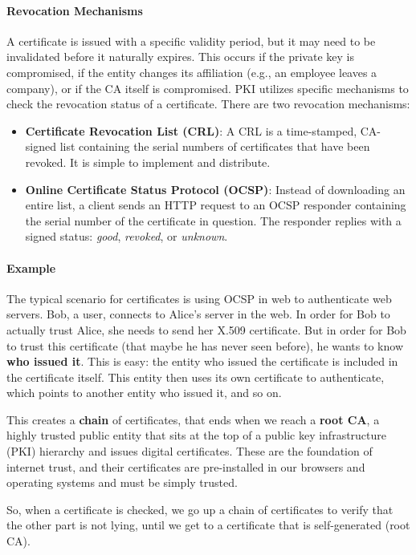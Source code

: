 \paragraph{Revocation Mechanisms}
A certificate is issued with a specific validity period, but it may need to be invalidated before it naturally expires. This occurs if the private key is compromised, if the entity changes its affiliation (e.g., an employee leaves a company), or if the CA itself is compromised. PKI utilizes specific mechanisms to check the revocation status of a certificate. There are two revocation mechanisms:
\begin{itemize}
    \item \textbf{Certificate Revocation List (CRL)}: A CRL is a time-stamped, CA-signed list containing the serial numbers of certificates that have been revoked. It is simple to implement and distribute.
    \item \textbf{Online Certificate Status Protocol (OCSP)}: Instead of downloading an entire list, a client sends an HTTP request to an OCSP responder containing the serial number of the certificate in question. The responder replies with a signed status: \textit{good}, \textit{revoked}, or \textit{unknown}.

\end{itemize}

\paragraph{Example}
The typical scenario for certificates is using OCSP in web to authenticate web servers. Bob, a user, connects to Alice's server in the web. In order for Bob to actually trust Alice, she needs to send her X.509 certificate. But in order for Bob to trust this certificate (that maybe he has never seen before), he wants to know \textbf{who issued it}. This is easy: the entity who issued the certificate is included in the certificate itself. This entity then uses its own certificate to authenticate, which points to another entity who issued it, and so on.

This creates a \textbf{chain} of certificates, that ends when we reach a \textbf{root CA}, a highly trusted public entity that sits at the top of a public key infrastructure (PKI) hierarchy and issues digital certificates. These are the foundation of internet trust, and their certificates are pre-installed in our browsers and operating systems and must be simply trusted.

So, when a certificate is checked, we go up a chain of certificates to verify that the other part is not lying, until we get to a certificate that is self-generated (root CA).
